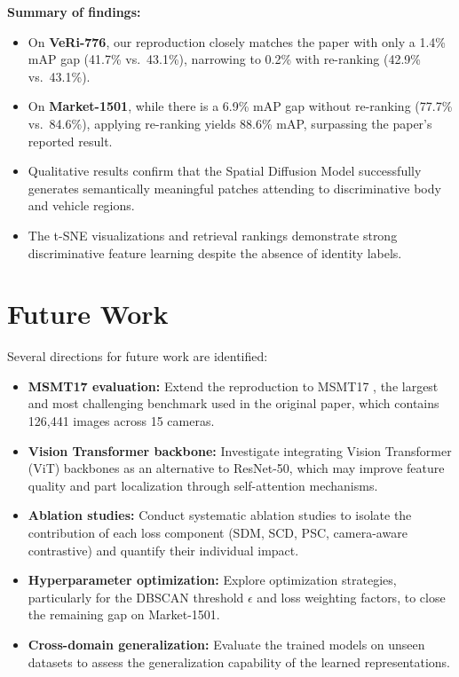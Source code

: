 \textbf{Summary of findings:}
\begin{itemize}
    \item On \textbf{VeRi-776}, our reproduction closely matches the paper with only a 1.4\% mAP gap (41.7\% vs.\ 43.1\%), narrowing to 0.2\% with re-ranking (42.9\% vs.\ 43.1\%).
    \item On \textbf{Market-1501}, while there is a 6.9\% mAP gap without re-ranking (77.7\% vs.\ 84.6\%), applying re-ranking yields 88.6\% mAP, surpassing the paper's reported result.
    \item Qualitative results confirm that the Spatial Diffusion Model successfully generates semantically meaningful patches attending to discriminative body and vehicle regions.
    \item The t-SNE visualizations and retrieval rankings demonstrate strong discriminative feature learning despite the absence of identity labels.
\end{itemize}

\section{Future Work}

Several directions for future work are identified:

\begin{itemize}
    \item \textbf{MSMT17 evaluation:} Extend the reproduction to MSMT17 \cite{wei2018msmt17}, the largest and most challenging benchmark used in the original paper, which contains 126,441 images across 15 cameras.
    \item \textbf{Vision Transformer backbone:} Investigate integrating Vision Transformer (ViT) backbones as an alternative to ResNet-50, which may improve feature quality and part localization through self-attention mechanisms.
    \item \textbf{Ablation studies:} Conduct systematic ablation studies to isolate the contribution of each loss component (SDM, SCD, PSC, camera-aware contrastive) and quantify their individual impact.
    \item \textbf{Hyperparameter optimization:} Explore optimization strategies, particularly for the DBSCAN threshold $\epsilon$ and loss weighting factors, to close the remaining gap on Market-1501.
    \item \textbf{Cross-domain generalization:} Evaluate the trained models on unseen datasets to assess the generalization capability of the learned representations.
\end{itemize}
